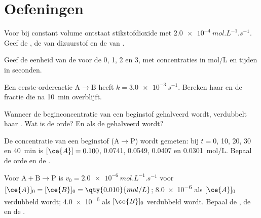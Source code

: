 \section{Oefeningen}

\begin{exercise}[$\star$]\label{exo:b1:rate-laws:1}
Voor  bij constant volume ontstaat stikstofdioxide
met $\qty{2.0e-4}{mol.L^{-1}.s^{-1}}$. Geef de , de
 van dizuurstof en de  van
.
\end{exercise}

\begin{exercise}[$\star$]\label{exo:b1:rate-laws:2}
Geef de eenheid van de  voor de  0, 1, 2
en 3, met concentraties in \unit{mol/L} en tijden in seconden.
\end{exercise}

\begin{exercise}[$\star$]\label{exo:b1:rate-laws:3}
Een eerste-ordereactie $\mathrm{A} \longrightarrow \mathrm{B}$ heeft $k = \qty{3.0e-3}{s^{-1}}$. Bereken
haar  en de fractie  die na \qty{10}{min} overblijft.
\end{exercise}

\begin{exercise}[$\star$]\label{exo:b1:rate-laws:4}
Wanneer de beginconcentratie van een beginstof gehalveerd wordt,
verdubbelt haar . Wat is de orde? En als de 
gehalveerd wordt?
\end{exercise}

\begin{exercise}[$\star\star$]\label{exo:b1:rate-laws:5}
De concentratie van een beginstof  ($\mathrm{A} \longrightarrow \mathrm{P}$) wordt gemeten: bij $t
= 0$, 10, 20, 30 en \qty{40}{min} is $[\ce{A}] = 0.100$, 0.0741, 0.0549,
0.0407 en \qty{0.0301}{mol/L}. Bepaal de orde en de .
\end{exercise}

\begin{exercise}[$\star\star$]\label{exo:b1:rate-laws:6}
Voor $\mathrm{A} + \mathrm{B} \longrightarrow \mathrm{P}$ is $v_0 = \qty{2.0e-6}{mol.L^{-1}.s^{-1}}$ voor $[\ce{A}]_0
= [\ce{B}]_0 = \qty{0.010}{mol/L}$; \qty{8.0e-6}{} als $[\ce{A}]_0$
verdubbeld wordt; \qty{4.0e-6}{} als $[\ce{B}]_0$ verdubbeld wordt.
Bepaal de , de  en de .
\end{exercise}

